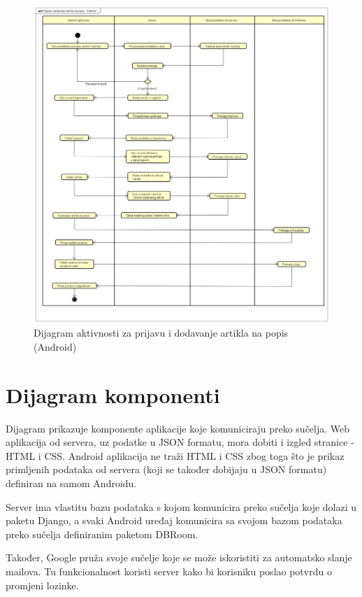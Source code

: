 			\begin{figure}[H]
				\centering
				\includegraphics[width=1.0\linewidth]{dijagrami/dodavanje-art.png}
				\caption{Dijagram aktivnosti za prijavu i dodavanje artikla na popis (Android)}
				\label{fig:act-dodavanje-art}
			\end{figure}
		
		\section{Dijagram komponenti}
		
			Dijagram prikazuje komponente aplikacije koje komuniciraju preko sučelja. Web aplikacija od servera, uz podatke u JSON formatu, mora dobiti i izgled stranice - HTML i CSS. Android aplikacija ne traži HTML i CSS zbog toga što je prikaz primljenih podataka od servera (koji se također dobijaju u JSON formatu) definiran na samom Androidu.
			
			Server ima vlastitu bazu podataka s kojom komunicira preko sučelja koje dolazi u paketu Django, a svaki Android uređaj komunicira sa svojom bazom podataka preko sučelja definiranim paketom DBRoom.
			
			Također, Google pruža svoje sučelje koje se može iskoristiti za automatsko slanje mailova. Tu funkcionalnost koristi server kako bi korisniku poslao potvrdu o promjeni lozinke.
		
